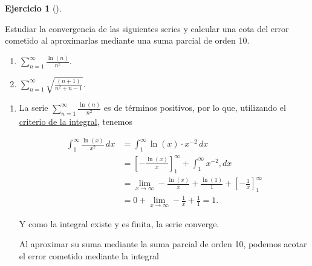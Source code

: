 \documentclass[
  a4paper,
]{scrreport}
\providecommand{\tightlist}{%
  \setlength{\itemsep}{0pt}\setlength{\parskip}{0pt}}\usepackage{longtable,booktabs,array}
\theoremstyle{definition}
\newtheorem{exercise}{Ejercicio}[chapter]
\theoremstyle{remark}
\begin{document}
\begin{exercise}[]\protect\hypertarget{exr-4}{}\label{exr-4}

Estudiar la convergencia de las siguientes series y calcular una cota
del error cometido al aproximarlas mediante una suma parcial de orden
10.

\begin{enumerate}
\def\labelenumi{\alph{enumi}.}
\tightlist
\item
  \(\displaystyle \sum_{n=1}^\infty \frac{\ln(n)}{n^2}\).
\item
  \(\displaystyle \sum_{n=1}^\infty \sqrt{\frac{(n+1)}{n^2+n-1}}\).
\end{enumerate}

\end{exercise}

\begin{tcolorbox}[enhanced jigsaw, opacityback=0, bottomtitle=1mm, coltitle=black, opacitybacktitle=0.6, colback=white, breakable, left=2mm, titlerule=0mm, bottomrule=.15mm, colbacktitle=quarto-callout-tip-color!10!white, toprule=.15mm, leftrule=.75mm, arc=.35mm, toptitle=1mm, colframe=quarto-callout-tip-color-frame, title=\textcolor{quarto-callout-tip-color}{\faLightbulb}\hspace{0.5em}{Solución}, rightrule=.15mm]

\begin{enumerate}
\def\labelenumi{\alph{enumi}.}
\item
  La serie \(\displaystyle \sum_{n=1}^\infty \frac{\ln(n)}{n^2}\) es de
  términos positivos, por lo que, utilizando el
  \href{https://aprendeconalf.es/analisis-manual/09-series.html\#thm-criterio-integral}{criterio
  de la integral}, tenemos

  \begin{align*}
  \int_1^\infty \frac{\ln(x)}{x^2}\,dx
  &= \int_1^\infty \ln(x) \cdot x^{-2}\,dx \\
  &= \left[-\frac{\ln(x)}{x}\right]_1^\infty + \int_1^\infty x^{-2},dx \tag{Integración por partes}\\
  &= \lim_{x\to\infty}-\frac{\ln(x)}{x} + \frac{\ln(1)}{1}+ \left[ -\frac{1}{x} \right]_1^\infty \\
  &= 0 + \lim_{x\to\infty} -\frac{1}{x} + \frac{1}{1}
  = 1.
  \end{align*}

  Y como la integral existe y es finita, la serie converge.

  Al aproximar su suma mediante la suma parcial de orden 10, podemos
  acotar el error cometido mediante la integral


\end{enumerate}
\end{tcolorbox}
\end{document}

